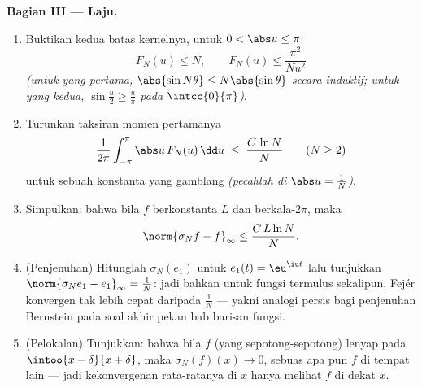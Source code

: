 \begin{problem}
\medskip
\noindent\textbf{Bagian III --- Laju.}
\begin{enumerate}[resume]
  \item Buktikan kedua batas kernelnya, untuk $0 < \abs u \leq
        \pi$:
        \[
        F_N(u) \leq N,
        \qquad
        F_N(u) \leq \frac{\pi^2}{N u^2}
        \]
        \emph{(untuk yang pertama, $\abs{\sin N\theta} \leq
        N\abs{\sin\theta}$ secara induktif; untuk yang kedua,
        $\sin\frac u2 \geq \frac{u}{\pi}$ pada
        $\intcc{0}{\pi}$)}.
  \item Turunkan taksiran momen pertamanya
        \[
        \frac{1}{2\pi}\int_{-\pi}^{\pi}\abs u\,F_N(u)\,\dd u
        \;\leq\; \frac{C\,\ln N}{N}
        \qquad (N \geq 2)
        \]
        untuk sebuah konstanta yang gamblang \emph{(pecahlah di $\abs u =
        \frac1N$)}.
  \item Simpulkan: bahwa bila $f$  berkonstanta $L$ dan berkala-$2\pi$,
        maka
        \[
        \norm{\sigma_N f - f}_\infty \leq \frac{C\,L\ln N}{N} .
        \]
  \item (Penjenuhan) Hitunglah $\sigma_N(e_1)$ untuk $e_1(t) =
        \eu^{\iu t}$ lalu tunjukkan $\norm{\sigma_Ne_1 - e_1}_\infty
        = \frac1N$: jadi bahkan untuk fungsi termulus sekalipun, Fejér
        konvergen tak lebih cepat daripada $\frac1N$ --- yakni analogi
        persis bagi penjenuhan Bernstein pada soal akhir pekan bab
        barisan fungsi.
  \item (Pelokalan) Tunjukkan: bahwa bila $f$ (yang  sepotong-sepotong)
        lenyap pada $\intoo{x - \delta}{x + \delta}$, maka
        $\sigma_N(f)(x) \to 0$, sebuas apa pun $f$ di tempat lain
        --- jadi kekonvergenan rata-ratanya di $x$ hanya melihat $f$ di dekat
        $x$.
\end{enumerate}


\end{problem}
